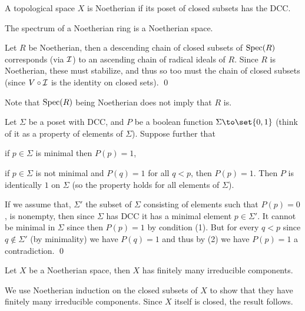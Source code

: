 \bdefn

    A topological space $X$ is {\emphcolor Noetherian} if its poset of closed subsets has the DCC.

\edefn

\bprop

    The spectrum of a Noetherian ring is a Noetherian space.

\eprop

\bproof

    Let $R$ be Noetherian, then a descending chain of closed subsets of ${\rm Spec}(R)$ corresponds (via ${{\cal I}}$) to an ascending chain of
    radical ideals of $R$.
    Since $R$ is Noetherian, these must stabilize, and thus so too must the chain of closed subsets (since $V\circ{{\cal I}}$ is the identity
    on closed sets).
    \qed

\eproof

Note that ${\rm Spec}(R)$ being Noetherian does not imply that $R$ is.

\blemm[title=Noetherian induction]

    Let $\Sigma$ be a poset with DCC, and $P$ be a boolean function $\Sigma\to\set{0,1}$ (think of it as a property of elements of $\Sigma$).
    Suppose further that
    \benum
        \item if $p\in\Sigma$ is minimal then $P(p)=1$,
        \item if $p\in\Sigma$ is not minimal and $P(q)=1$ for all $q<p$, then $P(p)=1$.
    \eenum
    Then $P$ is identically $1$ on $\Sigma$ (so the property holds for all elements of $\Sigma$).

\elemm

\bproof

    If we assume that, $\Sigma'$ the subset of $\Sigma$ consisting of elements such that $P(p)=0$, is nonempty, then since $\Sigma$ has DCC it has a
    minimal element $p\in\Sigma'$.
    It cannot be minimal in $\Sigma$ since then $P(p)=1$ by condition (1).
    But for every $q<p$ since $q\notin\Sigma'$ (by minimality) we have $P(q)=1$ and thus by (2) we have $P(p)=1$ a contradiction.
    \qed

\eproof

\bprop

    Let $X$ be a Noetherian space, then $X$ has finitely many irreducible components.

\eprop

\bproof

    We use Noetherian induction on the closed subsets of $X$ to show that they have finitely many irreducible components.
    Since $X$ itself is closed, the result follows.

